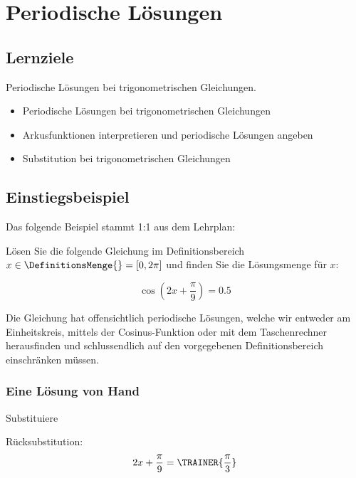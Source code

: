 
\section{Periodische Lösungen}

\subsection*{Lernziele}

Periodische Lösungen bei trigonometrischen Gleichungen.

\begin{itemize}
\item Periodische Lösungen bei trigonometrischen Gleichungen
\item Arkusfunktionen interpretieren und periodische Lösungen angeben
\item Substitution bei trigonometrischen Gleichungen
\end{itemize}
\newpage


\subsection{Einstiegsbeispiel}
Das folgende Beispiel stammt 1:1 aus dem Lehrplan:

Lösen Sie die folgende Gleichung im Definitionsbereich $x \in \DefinitionsMenge{} = [ 0, 2\pi]$ und finden Sie die Lösungsmenge für $x$:

$$\cos\left(2x+\frac{\pi}{9}\right) = 0.5$$

Die Gleichung hat offensichtlich periodische Lösungen, welche wir
entweder am Einheitskreis, mittels der Cosinus-Funktion oder mit dem
Taschenrechner herausfinden und schlussendlich auf den vorgegebenen
Definitionsbereich einschränken müssen.

\subsubsection{Eine Lösung von Hand}

Substituiere


Rücksubstitution:
$$ 2x+\frac{\pi}9 = \TRAINER{\frac{\pi}3}$$

